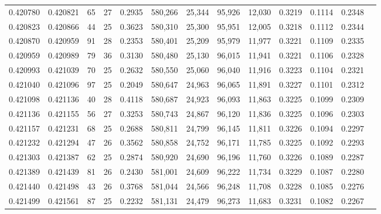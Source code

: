 \begin{tabular}{rrrrrrrrrrrrr}
0.420780 & 0.420821 &    65 &  27 &                                     0.2935 & 580,266 &  25,344 &  95,926 &  12,030 & 0.3219 & 0.1114 & 0.2348 \\
0.420823 & 0.420866 &    44 &  25 &                                     0.3623 & 580,310 &  25,300 &  95,951 &  12,005 & 0.3218 & 0.1112 & 0.2344 \\
0.420870 & 0.420959 &    91 &  28 &                                     0.2353 & 580,401 &  25,209 &  95,979 &  11,977 & 0.3221 & 0.1109 & 0.2335 \\
0.420959 & 0.420989 &    79 &  36 &                                     0.3130 & 580,480 &  25,130 &  96,015 &  11,941 & 0.3221 & 0.1106 & 0.2328 \\
0.420993 & 0.421039 &    70 &  25 &                                     0.2632 & 580,550 &  25,060 &  96,040 &  11,916 & 0.3223 & 0.1104 & 0.2321 \\
0.421040 & 0.421096 &    97 &  25 &                                     0.2049 & 580,647 &  24,963 &  96,065 &  11,891 & 0.3227 & 0.1101 & 0.2312 \\
0.421098 & 0.421136 &    40 &  28 &                                     0.4118 & 580,687 &  24,923 &  96,093 &  11,863 & 0.3225 & 0.1099 & 0.2309 \\
0.421136 & 0.421155 &    56 &  27 &                                     0.3253 & 580,743 &  24,867 &  96,120 &  11,836 & 0.3225 & 0.1096 & 0.2303 \\
0.421157 & 0.421231 &    68 &  25 &                                     0.2688 & 580,811 &  24,799 &  96,145 &  11,811 & 0.3226 & 0.1094 & 0.2297 \\
0.421232 & 0.421294 &    47 &  26 &                                     0.3562 & 580,858 &  24,752 &  96,171 &  11,785 & 0.3225 & 0.1092 & 0.2293 \\
0.421303 & 0.421387 &    62 &  25 &                                     0.2874 & 580,920 &  24,690 &  96,196 &  11,760 & 0.3226 & 0.1089 & 0.2287 \\
0.421389 & 0.421439 &    81 &  26 &                                     0.2430 & 581,001 &  24,609 &  96,222 &  11,734 & 0.3229 & 0.1087 & 0.2280 \\
0.421440 & 0.421498 &    43 &  26 &                                     0.3768 & 581,044 &  24,566 &  96,248 &  11,708 & 0.3228 & 0.1085 & 0.2276 \\
0.421499 & 0.421561 &    87 &  25 &                                     0.2232 & 581,131 &  24,479 &  96,273 &  11,683 & 0.3231 & 0.1082 & 0.2267 \\

\end{tabular}
